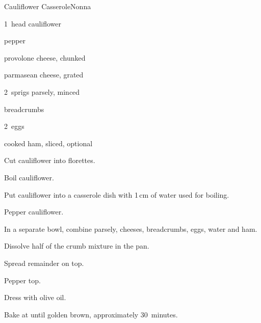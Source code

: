 \begin{recipe}{Cauliflower Casserole}{Nonna}{}

\begin{ingredients}
\item 1~head cauliflower
\item pepper
\item \C{\half} provolone cheese, chunked
\item \C{\half} parmasean cheese, grated
\item 2~sprigs parsely, minced
\item \C{\threequarter} breadcrumbs
\item 2~eggs
\item \C{\quarter} cooked ham, sliced, optional
\end{ingredients}

\begin{directions}
\item Cut cauliflower into florettes.
\item Boil cauliflower.
\item Put cauliflower into a casserole dish with 1\,cm of water used for boiling.
\item Pepper cauliflower.
\item In a separate bowl, combine parsely, cheeses, breadcrumbs, eggs, \C{\quarter} water and ham.
\item Dissolve half of the crumb mixture in the pan.
\item Spread remainder on top.
\item Pepper top.
\item Dress with olive oil.
\item Bake at  until golden brown, approximately 30~minutes.
\end{directions}

\end{recipe}
